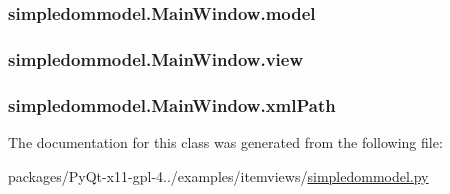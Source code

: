 \subsubsection[{model}]{\setlength{\rightskip}{0pt plus 5cm}simpledommodel.\+Main\+Window.\+model}\label{classsimpledommodel_1_1MainWindow_a77c369faa7adce6542b9f7a6b62d3f52}
\hypertarget{classsimpledommodel_1_1MainWindow_abad25c90bec051006f2ebfde03c830c1}{}
\subsubsection[{view}]{\setlength{\rightskip}{0pt plus 5cm}simpledommodel.\+Main\+Window.\+view}\label{classsimpledommodel_1_1MainWindow_abad25c90bec051006f2ebfde03c830c1}
\hypertarget{classsimpledommodel_1_1MainWindow_a733bcff053228ef88a35184c071ed90c}{}
\subsubsection[{xml\+Path}]{\setlength{\rightskip}{0pt plus 5cm}simpledommodel.\+Main\+Window.\+xml\+Path}\label{classsimpledommodel_1_1MainWindow_a733bcff053228ef88a35184c071ed90c}


The documentation for this class was generated from the following file\+:\begin{DoxyCompactItemize}
\item 
packages/\+Py\+Qt-\/x11-\/gpl-\/4../examples/itemviews/\hyperlink{simpledommodel_8py}{simpledommodel.\+py}\end{DoxyCompactItemize}

